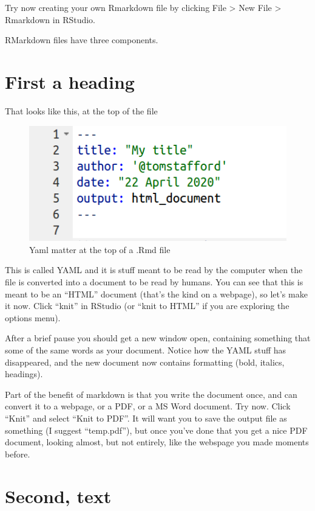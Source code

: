 \documentclass[]{book}
\begin{document}
Try now creating your own Rmarkdown file by clicking File \textgreater{}
New File \textgreater{} Rmarkdown in RStudio.

RMarkdown files have three components.

\section{First a heading}\label{first-a-heading}

That looks like this, at the top of the file

\begin{figure}
\centering
\includegraphics{images/yaml.png}
\caption{Yaml matter at the top of a .Rmd file}
\end{figure}

This is called YAML and it is stuff meant to be read by the computer
when the file is converted into a document to be read by humans. You can
see that this is meant to be an ``HTML'' document (that's the kind on a
webpage), so let's make it now. Click ``knit'' in RStudio (or ``knit to
HTML'' if you are exploring the options menu).

After a brief pause you should get a new window open, containing
something that some of the same words as your document. Notice how the
YAML stuff has disappeared, and the new document now contains formatting
(bold, italics, headings).

Part of the benefit of markdown is that you write the document once, and
can convert it to a webpage, or a PDF, or a MS Word document. Try now.
Click ``Knit'' and select ``Knit to PDF''. It will want you to save the
output file as something (I suggest ``temp.pdf''), but once you've done
that you get a nice PDF document, looking almost, but not entirely, like
the webspage you made moments before.

\section{Second, text}\label{second-text}
\end{document}
